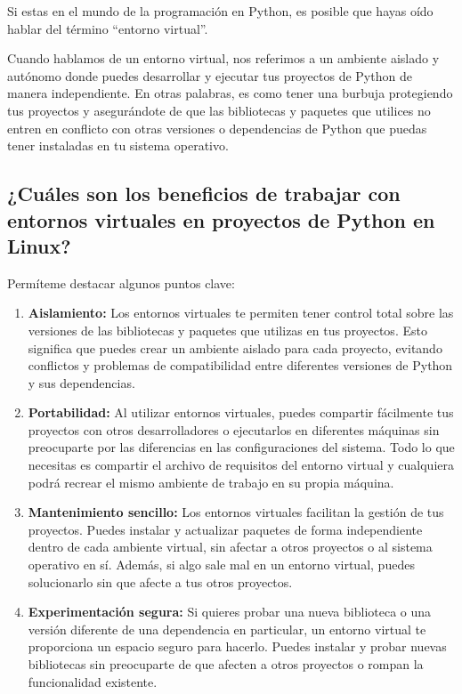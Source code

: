 \documentclass[
  a4paper,
]{article}
\begin{document}
Si estas en el mundo de la programación en Python, es posible que hayas
oído hablar del término ``entorno virtual''.

Cuando hablamos de un entorno virtual, nos referimos a un ambiente
aislado y autónomo donde puedes desarrollar y ejecutar tus proyectos de
Python de manera independiente. En otras palabras, es como tener una
burbuja protegiendo tus proyectos y asegurándote de que las bibliotecas
y paquetes que utilices no entren en conflicto con otras versiones o
dependencias de Python que puedas tener instaladas en tu sistema
operativo.

\hypertarget{cuuxe1les-son-los-beneficios-de-trabajar-con-entornos-virtuales-en-proyectos-de-python-en-linux}{%
\subsection{¿Cuáles son los beneficios de trabajar con entornos
virtuales en proyectos de Python en
Linux?}\label{cuuxe1les-son-los-beneficios-de-trabajar-con-entornos-virtuales-en-proyectos-de-python-en-linux}}

Permíteme destacar algunos puntos clave:

\begin{enumerate}
\def\labelenumi{\arabic{enumi}.}
\item
  \textbf{Aislamiento:} Los entornos virtuales te permiten tener control
  total sobre las versiones de las bibliotecas y paquetes que utilizas
  en tus proyectos. Esto significa que puedes crear un ambiente aislado
  para cada proyecto, evitando conflictos y problemas de compatibilidad
  entre diferentes versiones de Python y sus dependencias.
\item
  \textbf{Portabilidad:} Al utilizar entornos virtuales, puedes
  compartir fácilmente tus proyectos con otros desarrolladores o
  ejecutarlos en diferentes máquinas sin preocuparte por las diferencias
  en las configuraciones del sistema. Todo lo que necesitas es compartir
  el archivo de requisitos del entorno virtual y cualquiera podrá
  recrear el mismo ambiente de trabajo en su propia máquina.
\item
  \textbf{Mantenimiento sencillo:} Los entornos virtuales facilitan la
  gestión de tus proyectos. Puedes instalar y actualizar paquetes de
  forma independiente dentro de cada ambiente virtual, sin afectar a
  otros proyectos o al sistema operativo en sí. Además, si algo sale mal
  en un entorno virtual, puedes solucionarlo sin que afecte a tus otros
  proyectos.
\item
  \textbf{Experimentación segura:} Si quieres probar una nueva
  biblioteca o una versión diferente de una dependencia en particular,
  un entorno virtual te proporciona un espacio seguro para hacerlo.
  Puedes instalar y probar nuevas bibliotecas sin preocuparte de que
  afecten a otros proyectos o rompan la funcionalidad existente.
\end{enumerate}
\end{document}
